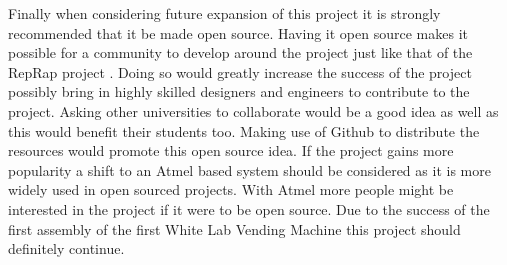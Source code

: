 \documentclass[a4paper,11pt]{article}
\numberwithin{figure}{section}
\numberwithin{table}{section}
\begin{document}
Finally when considering future expansion of this project it is strongly recommended that it be made open source. Having it open source makes it possible for a community to develop around the project just like that of the RepRap project \cite{reprap}. Doing so would greatly increase the success of the project possibly bring in highly skilled designers and engineers to contribute to the project. Asking other universities to collaborate would be a good idea as well as this would benefit their students too. Making use of Github to distribute the resources would promote this open source idea. If the project gains more popularity a shift to an Atmel based system should be considered as it is more widely used in open sourced projects. With Atmel more people might be interested in the project if it were to be open source. Due to the success of the first assembly of the first White Lab Vending Machine this project should definitely continue.
\newpage




\newpage
\end{document}
